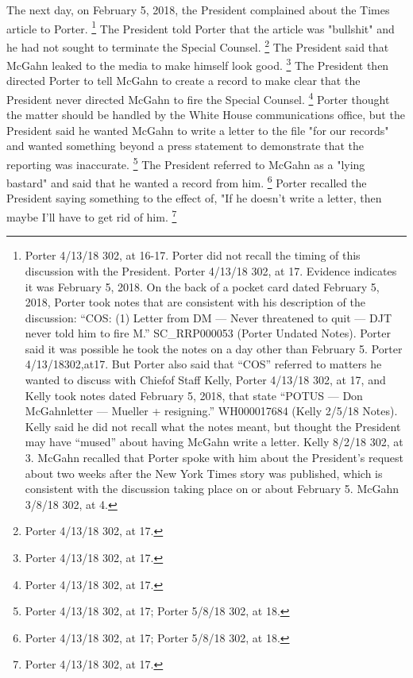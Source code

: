 The next day, on February 5, 2018, the President complained about the Times article to Porter.%
\footnote{Porter 4/13/18 302, at 16-17.
Porter did not recall the timing of this discussion with the President.
Porter 4/13/18 302, at 17.
Evidence indicates it was February 5, 2018.
On the back of a pocket card dated February 5, 2018, Porter took notes that are consistent with his description of the discussion: “COS: (1) Letter from DM — Never threatened to quit — DJT never told him to fire M.”
SC\_RRP000053 (Porter Undated Notes).
Porter said it was possible he took the notes on a day other than February 5.
Porter 4/13/18302,at17.
But Porter also said that “COS” referred to matters he wanted to discuss with Chiefof Staff Kelly, Porter 4/13/18 302, at 17, and Kelly took notes dated February 5, 2018, that state “POTUS — Don McGahnletter — Mueller + resigning.”
WH000017684 (Kelly 2/5/18 Notes).
Kelly said he did not recall what the notes meant, but thought the President may have “mused” about having McGahn write a letter.
Kelly 8/2/18 302, at 3.
McGahn recalled that Porter spoke with him about the President’s request about two weeks after the New York Times story was published, which is consistent with the discussion taking place on or about February 5.
McGahn 3/8/18 302, at 4.}
The President told Porter that the article was "bullshit" and he had not sought to terminate the Special Counsel.%
\footnote{Porter 4/13/18 302, at 17.}
The President said that McGahn leaked to the media to make himself look good.%
\footnote{Porter 4/13/18 302, at 17.}
The President then directed Porter to tell McGahn to create a record to make clear that the President never directed McGahn to fire the Special Counsel.%
\footnote{Porter 4/13/18 302, at 17.}
Porter thought the matter should be handled by the White House communications office, but the President said he wanted McGahn to write a letter to the file "for our records" and wanted something beyond a press statement to demonstrate that the reporting was inaccurate.%
\footnote{Porter 4/13/18 302, at 17;
Porter 5/8/18 302, at 18.}
The President referred to McGahn as a "lying bastard" and said that he wanted a record from him.%
\footnote{Porter 4/13/18 302, at 17;
Porter 5/8/18 302, at 18.}
Porter recalled the President saying something to the effect of, "If he doesn't write a letter, then maybe I'll have to get rid of him.%
\footnote{Porter 4/13/18 302, at 17.}


